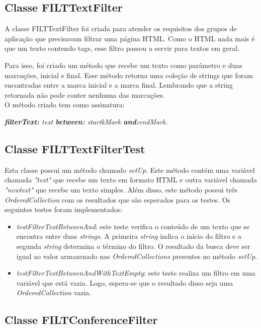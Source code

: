 \subsection{Classe FILTTextFilter}

A classe FILTTextFilter foi criada para atender os requisitos dos grupos de aplicação que precisavam filtrar uma página HTML. Como o HTML nada mais é que um texto contendo tags, esse filtro passou a servir para textos em geral.

Para isso, foi criado um método que recebe um texto como parâmetro e duas marcações, inicial e final. Esse método retorna uma coleção de strings que foram encontradas entre a marca inicial e a marca final. Lembrando que a string retornada não pode conter nenhuma das marcações.\\

O método criado tem como assinatura: 

\textit{\textbf{filterText:} text \textbf{between:} startkMark \textbf{and:}endMark.}

\subsection{Classe FILTTextFilterTest}

Esta classe possui um método chamado \textit{setUp}. Este método contém uma variável chamada \textit{"text"} que recebe um texto em formato HTML e outra variável chamada \textit{"newtext"} que recebe um texto simples. Além disso, este método possui três \textit{OrderedCollection} com os resultados que são esperados para os testes. Os seguintes testes foram implementados:

\begin{itemize}
\item \textit{testFilterTextBetweenAnd}: este teste verifica o conteúdo de um texto que se encontra entre duas \textit{strings}. A primeira \textit{string} indica o início do filtro e a segunda \textit{string} determina o término do filtro. O resultado da busca deve ser igual ao valor armazenado nas \textit{OrderedCollections} presentes no método \textit{setUp}. 
\item \textit{testFilterTextBetweenAndWithTextEmpty}: este teste realiza um filtro em uma variável que está vazia. Logo, espera-se que o resultado disso seja uma \textit{OrderedCollection} vazia. 
\end{itemize}

\subsection{Classe FILTConferenceFilter}

